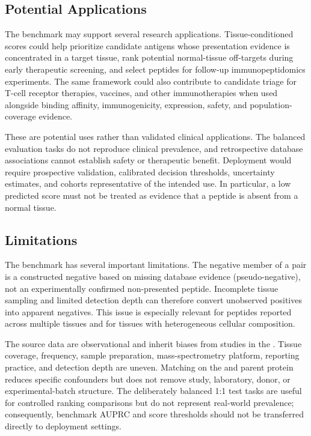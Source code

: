 \subsection{Potential Applications}

The benchmark may support several research applications. Tissue-conditioned scores could help prioritize candidate antigens whose presentation evidence is concentrated in a target tissue, rank potential normal-tissue off-targets during early therapeutic screening, and select peptides for follow-up immunopeptidomics experiments. The same framework could also contribute to candidate triage for T-cell receptor therapies, vaccines, and other immunotherapies when used alongside binding affinity, immunogenicity, expression, safety, and population-coverage evidence.

These are potential uses rather than validated clinical applications. The balanced evaluation tasks do not reproduce clinical prevalence, and retrospective database associations cannot establish safety or therapeutic benefit. Deployment would require prospective validation, calibrated decision thresholds, uncertainty estimates, and cohorts representative of the intended use. In particular, a low predicted score must not be treated as evidence that a peptide is absent from a normal tissue.

\subsection{Limitations}

The benchmark has several important limitations. The negative member of a pair is a constructed negative based on missing database evidence (pseudo-negative), not an experimentally confirmed non-presented peptide. Incomplete tissue sampling and limited detection depth can therefore convert unobserved positives into apparent negatives. This issue is especially relevant for peptides reported across multiple tissues and for tissues with heterogeneous cellular composition.

The source data are observational and inherit biases from studies in the \plainIEDB{}. Tissue coverage, \plainHLA{} frequency, sample preparation, mass-spectrometry platform, reporting practice, and detection depth are uneven. Matching on the \plainMHC{} and parent protein reduces specific confounders but does not remove study, laboratory, donor, or experimental-batch structure. The deliberately balanced 1:1 test tasks are useful for controlled ranking comparisons but do not represent real-world prevalence; consequently, benchmark AUPRC and score thresholds should not be transferred directly to deployment settings.

